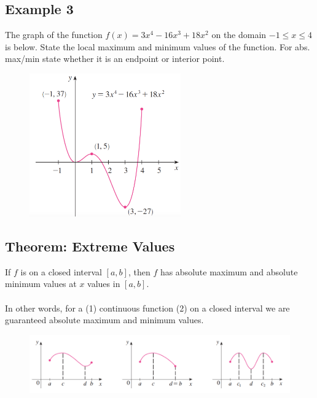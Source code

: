 \documentclass[10pt]{book}
\theoremstyle{definition}
\begin{document}
\subsection*{Example 3} The graph of the function $f(x)=3x^4-16x^3+18x^2$ on the domain $-1\leq x\leq 4$ is below. State the local maximum and minimum values of the function. For abs. max/min state whether it is an endpoint or interior point.
\begin{figure}[h]
    \includegraphics[width=6.5cm]{Graph_4.png}
\end{figure}
\clearpage
\begin{tcolorbox}
\subsection*{Theorem: Extreme Values}
If $f$ is \underline{\hspace{3cm}} on a closed interval $[a,b]$, then $f$ has absolute maximum and absolute minimum values at $x$ values in $[a,b]$.\\ \\
In other words, for a (1) continuous function (2) on a closed interval we are guaranteed absolute maximum and minimum values.
\end{tcolorbox}
\begin{figure}[h]
    \centering
    \includegraphics{Graph_5.png}
\end{figure}
\end{document}
